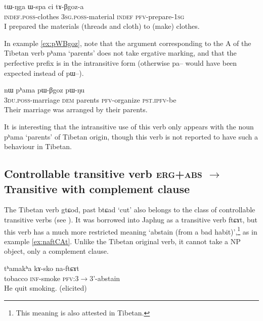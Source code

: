 \documentclass[oldfontcommands,oneside,a4paper,11pt]{article}
\newcommand{\ipa}[1]{{\phon \mbox{#1}}} %
\begin{document}
\begin{exe}
\ex \label{ex:tABgoza}
\gll
\ipa{tɯ-ŋga} 	\ipa{ɯ-spa} 	\ipa{ci} 	\ipa{tɤ-βgoz-a} \\
\textsc{indef.poss}-clothes \textsc{3sg.poss}-material \textsc{indef} \textsc{pfv}-prepare-\textsc{1sg} \\
\glt I prepared the materials (threads and cloth) to (make) clothes.
\end{exe}

In example \ref{ex:pWBgoz}, note that the argument corresponding to the A of the Tibetan verb \ipa{pʰama} `parents' does not take ergative marking, and that the perfective prefix is in the intransitive form (otherwise \ipa{pa--} would have been expected instead of \ipa{pɯ--}).

\begin{exe}
\ex \label{ex:pWBgoz}
\gll \ipa{ndʑi-stɯnmɯ} 	\ipa{nɯ} 	\ipa{pʰama} 	\ipa{pɯ-βgoz} 	\ipa{pɯ-ŋu} \\
\textsc{3du.poss}-marriage \textsc{dem} parents \textsc{pfv}-organize \textsc{pst.ipfv}-be \\
\glt Their marriage was arranged by their parents.
\end{exe}


It is interesting that the intransitive use of this verb only appears with the noun \ipa{pʰama} `parents' of Tibetan origin, though this verb is not reported to have such a behaviour in Tibetan.



\subsection{Controllable transitive verb \textsc{erg+abs}  $\rightarrow$ Transitive with complement clause}
The Tibetan verb \ipa{gtɕod}, past \ipa{btɕad} `cut' also belongs to the class of controllable transitive verbs (see \citealt[86:187]{haller04themchen}). It was borrowed into Japhug as a transitive verb \ipa{ftɕɤt}, but this verb has a much more restricted meaning `abstain (from a bad habit)',\footnote{This meaning is also attested in Tibetan.} as in example \ref{ex:naftCAt}. Unlike the Tibetan original verb, it cannot take a NP object, only a complement clause.

\begin{exe}
\ex \label{ex:naftCAt}
\gll
\ipa{tʰamakʰa} \ipa{kɤ-sko} \ipa{na-ftɕɤt}\\
tobacco \textsc{inf}-smoke \textsc{pfv}:3$\rightarrow$3'-abstain \\
\glt He quit smoking. (elicited)
\end{exe}
\end{document}
